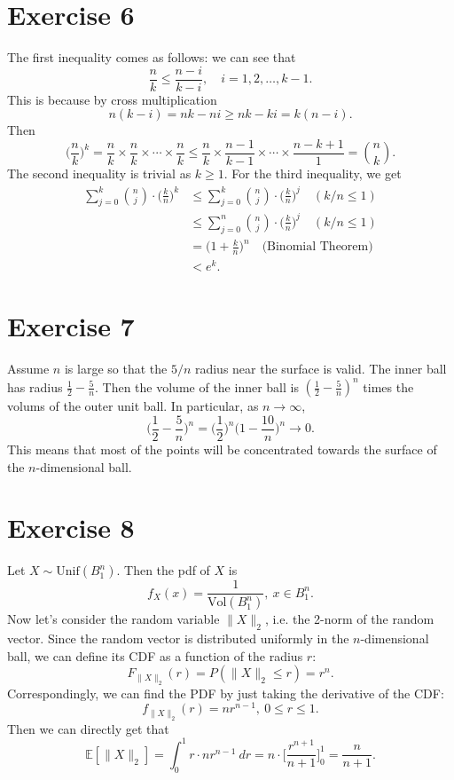 \documentclass{article}
\begin{document}
\section*{Exercise 6}
The first inequality comes as follows: we can see that 
\[ \frac{n}{k} \leq \frac{n - i}{k - i}, \quad i = 1, 2, \dots, k - 1. \]
This is because by cross multiplication
\[ n(k - i) = nk - ni \geq nk - ki = k(n - i). \]
Then
\[ \biggl( \frac{n}{k} \biggr)^k 
= \frac{n}{k} \times \frac{n}{k} \times \cdots \times \frac{n}{k} 
\leq \frac{n}{k} \times \frac{n - 1}{k - 1} \times \cdots \times \frac{n - k + 1}{1} 
= \binom{n}{k}. \]
The second inequality is trivial as $k \geq 1$.
For the third inequality, we get 
\begin{align*}
	\sum_{j = 0}^{k} \binom{n}{j} \cdot \biggl( \frac{k}{n} \biggr)^k 
	&\leq \sum_{j = 0}^{k} \binom{n}{j} \cdot \biggl( \frac{k}{n} \biggr)^j \quad (k/n \leq 1)\\
	&\leq \sum_{j = 0}^{n} \binom{n}{j} \cdot \biggl( \frac{k}{n} \biggr)^j \quad (k/n \leq 1)\\
	&= \biggl( 1 + \frac{k}{n} \biggr)^n \quad \text{(Binomial Theorem)} \\
	&< e^k.
\end{align*}


\newpage
\section*{Exercise 7}
Assume $n$ is large so that the $5/n$ radius near the surface is valid. The inner ball has radius 
$\frac{1}{2} - \frac{5}{n}$. Then the volume of the inner ball is $(\frac{1}{2} - \frac{5}{n})^n$ times 
the volums of the outer unit ball. In particular, as $n \to \infty$, 
\[ \biggl( \frac{1}{2} - \frac{5}{n} \biggr)^n 
= \biggl( \frac{1}{2} \biggr)^n \biggl( 1 - \frac{10}{n} \biggr)^n \to 0. \]
This means that most of the points will be concentrated towards the surface of the $n$-dimensional ball.


\newpage
\section*{Exercise 8}
Let $X \sim \text{Unif}(B_1^n)$. Then the pdf of $X$ is 
\[ f_X(x) = \frac{1}{\text{Vol}(B_1^n)}, \ x \in B_1^n. \]
Now let's consider the random variable $\|X\|_2$, i.e. the 2-norm of the random vector. Since 
the random vector is distributed uniformly in the $n$-dimensional ball, we can define its CDF as a 
function of the radius $r$: 
\[ F_{\|X\|_2}(r) = P(\|X\|_2 \leq r) = r^n. \]
Correspondingly, we can find the PDF by just taking the derivative of the CDF: 
\[ f_{\|X\|_2}(r) = nr^{n - 1}, \ 0 \leq r \leq 1. \]
Then we can directly get that 
\[ \mathbb{E}[\|X\|_2] = \int_{0}^{1} r \cdot nr^{n - 1} \ dr 
= n \cdot \biggl[ \frac{r^{n + 1}}{n + 1} \biggr]_0^1 = \frac{n}{n + 1}. \]
\end{document}
